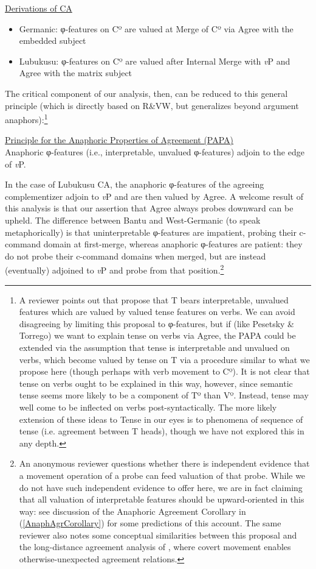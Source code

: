 \documentclass[output=paper
,modfonts
,nonflat
]{langsci/langscibook}
\begin{document}
\ea \underline{Derivations of CA}
\begin{itemize}
\item Germanic: φ-features on Cº are valued at Merge of Cº via Agree with the embedded subject
\item Lubukusu: φ-features on Cº are valued after Internal Merge with \textit{v}P and Agree with the matrix subject
\end{itemize}
\z

\noindent The critical component of our analysis, then, can be reduced to this general principle (which is directly based on R\&VW, but generalizes beyond argument anaphors):\footnote{A reviewer points out that \citet{Pesetsky:2007} propose that T bears interpretable, unvalued features which are valued by valued tense features on verbs. We can avoid disagreeing by limiting this proposal to φ-features, but if (like Pesetsky \& Torrego) we want to explain tense on verbs via Agree, the PAPA could be extended via the assumption that tense is interpretable and unvalued on verbs, which become valued by tense on T via a procedure similar to what we propose here (though perhaps with verb movement to Cº). It is not clear that tense on verbs ought to be explained in this way, however, since semantic tense seems more likely to be a component of Tº than Vº. Instead, tense may well come to be inflected on verbs post-syntactically. The more likely extension of these ideas to Tense in our eyes is to phenomena of sequence of tense (i.e. agreement between T heads), though we have not explored this in any depth.} 

\ea	\label{PAPA}
\underline{Principle for the Anaphoric Properties of Agreement  (PAPA)} \\
Anaphoric φ-features (i.e., interpretable, unvalued φ-features) adjoin to the edge of \textit{v}P.

\z
\noindent In the case of Lubukusu CA, the anaphoric φ-features of the agreeing complementizer adjoin to \textit{v}P and are then valued by Agree. A welcome result of this analysis is that our assertion that Agree always probes downward can be upheld. The difference between Bantu and West-Germanic (to speak metaphorically) is that uninterpretable φ-features are impatient, probing their c-command domain at first-merge, whereas anaphoric φ-features are patient: they do not probe their c-command domains when merged, but are instead (eventually) adjoined to \textit{v}P and probe from that position.\footnote{An anonymous reviewer questions whether there is independent evidence that a movement operation of a probe can feed valuation of that probe. While we do not have such independent evidence to offer here, we are in fact claiming that all valuation of interpretable features should be upward-oriented in this way: see discussion of the Anaphoric Agreement Corollary in (\ref{AnaphAgrCorollary}) for some predictions of this account. The same reviewer also notes some conceptual similarities between this proposal and the long-distance agreement analysis of \citet{Potsdam:2001}, where covert movement enables otherwise-unexpected agreement relations.}  
\end{document}
